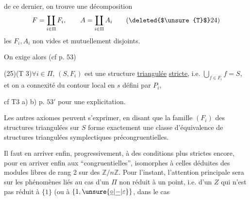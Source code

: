 
de ce dernier, on trouve une décomposition
\[
F=\coprod_{i\in\Pi}F_i,\qquad A=\coprod_{i\in\Pi}A_i\tag*{(\deleted{$\unsure{T}$}24)}
\]
les $F_i,A_i$ non vides et mutuellement disjoints.

On exige alors (cf p. 53)

(25)\qquad (T 3)\qquad $\forall i\in\Pi$, $(S,F_i)$ est une structure \uline{triangulée} \uline{stricte}, i.e. $\bigcup_{f\in F_i}f=S$, et on a connexité du contour local en $s$ défini par $P_i$,

cf T3 a) b) p. $53'$ pour une explicitation.

Les autres axiomes peuvent s'exprimer, en disant que la famille $(F_i)$ des structures triangulées sur $S$ forme exactement une classe d'équivalence de structures triangulées symplectiques précongruentielles.


Il faut en arriver enfin, progressivement, à des conditions plus strictes encore, pour en arriver enfin aux   ``congruentielles'', isomorphes à celles déduites des modules libres de rang 2 sur des $\mathbb Z/n\mathbb Z$. Pour l'instant, l'attention principale  sera sur les phénomènes liés au cas d'un $\Pi$ non réduit à un point, i.e. d'un $Z$ qui n'est pas réduit à $\{1\}$ (ou à $\{1,\unsure{\underline{\circ}|\underline{-}|\varepsilon}\}$, dans le cas

